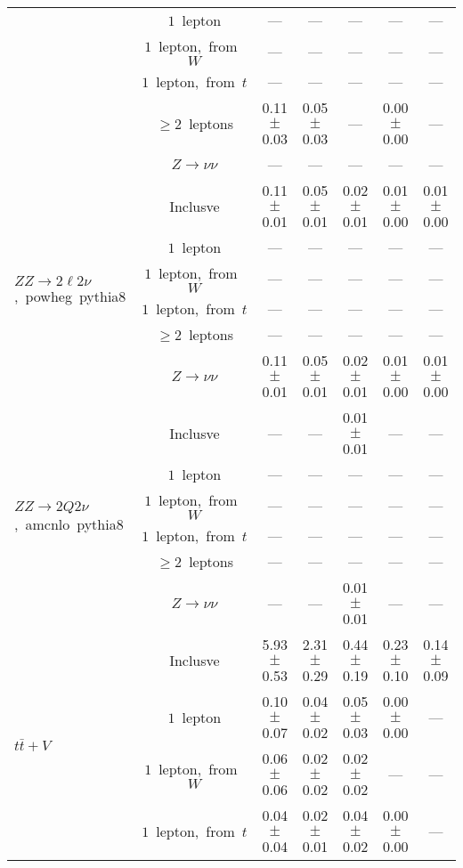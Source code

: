 \documentclass{article}
\begin{document}
\begin{longtable}{|l|c|c|c|c|c|c|}
 & $1$~lepton  & ---  & ---  & ---  & ---  & --- \\* 
 & $1$~lepton,~from~$W$  & ---  & ---  & ---  & ---  & --- \\* 
 & $1$~lepton,~from~$t$  & ---  & ---  & ---  & ---  & --- \\* 
 & $\ge2$~leptons  & 0.11 $\pm$ 0.03  & 0.05 $\pm$ 0.03  & ---  & 0.00 $\pm$ 0.00  & --- \\* 
 & $Z\rightarrow\nu\nu$  & ---  & ---  & ---  & ---  & --- \\* 
\hline 
\multirow{6}{*}{$ZZ{\rightarrow}2{\ell}2{\nu}$,~powheg~pythia8} & Inclusve  & 0.11 $\pm$ 0.01  & 0.05 $\pm$ 0.01  & 0.02 $\pm$ 0.01  & 0.01 $\pm$ 0.00  & 0.01 $\pm$ 0.00 \\* 
 & $1$~lepton  & ---  & ---  & ---  & ---  & --- \\* 
 & $1$~lepton,~from~$W$  & ---  & ---  & ---  & ---  & --- \\* 
 & $1$~lepton,~from~$t$  & ---  & ---  & ---  & ---  & --- \\* 
 & $\ge2$~leptons  & ---  & ---  & ---  & ---  & --- \\* 
 & $Z\rightarrow\nu\nu$  & 0.11 $\pm$ 0.01  & 0.05 $\pm$ 0.01  & 0.02 $\pm$ 0.01  & 0.01 $\pm$ 0.00  & 0.01 $\pm$ 0.00 \\* 
\hline 
\multirow{6}{*}{$ZZ{\rightarrow}2Q2{\nu}$,~amcnlo~pythia8} & Inclusve  & ---  & ---  & 0.01 $\pm$ 0.01  & ---  & --- \\* 
 & $1$~lepton  & ---  & ---  & ---  & ---  & --- \\* 
 & $1$~lepton,~from~$W$  & ---  & ---  & ---  & ---  & --- \\* 
 & $1$~lepton,~from~$t$  & ---  & ---  & ---  & ---  & --- \\* 
 & $\ge2$~leptons  & ---  & ---  & ---  & ---  & --- \\* 
 & $Z\rightarrow\nu\nu$  & ---  & ---  & 0.01 $\pm$ 0.01  & ---  & --- \\* 
\hline 
\multirow{6}{*}{$t\bar{t}+V$} & Inclusve  & 5.93 $\pm$ 0.53  & 2.31 $\pm$ 0.29  & 0.44 $\pm$ 0.19  & 0.23 $\pm$ 0.10  & 0.14 $\pm$ 0.09 \\* 
 & $1$~lepton  & 0.10 $\pm$ 0.07  & 0.04 $\pm$ 0.02  & 0.05 $\pm$ 0.03  & 0.00 $\pm$ 0.00  & --- \\* 
 & $1$~lepton,~from~$W$  & 0.06 $\pm$ 0.06  & 0.02 $\pm$ 0.02  & 0.02 $\pm$ 0.02  & ---  & --- \\* 
 & $1$~lepton,~from~$t$  & 0.04 $\pm$ 0.04  & 0.02 $\pm$ 0.01  & 0.04 $\pm$ 0.02  & 0.00 $\pm$ 0.00  & --- \\* 

\end{longtable}
\end{document}
